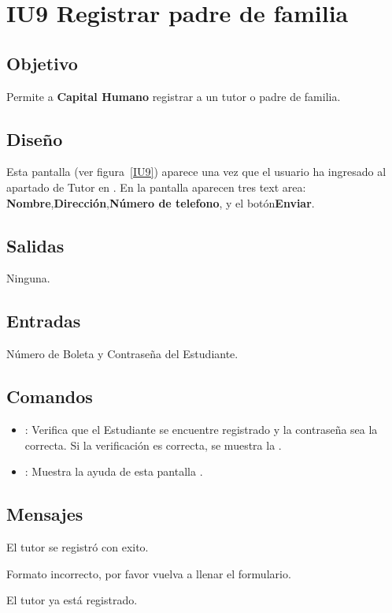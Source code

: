 \newpage
\section{IU9 Registrar padre de familia}

\subsection{Objetivo}
	Permite a {\bf Capital Humano} registrar a un tutor o padre de familia.

\subsection{Diseño}
	Esta pantalla  (ver figura~\ref{IU9}) aparece una vez que el usuario ha ingresado al apartado de Tutor en . 
 En la pantalla aparecen tres text area: {\bf Nombre},{\bf Dirección},{\bf Número de telefono}, y el botón{\bf Enviar}. 
 

\subsection{Salidas}

	Ninguna.

\subsection{Entradas}
Número de Boleta y Contraseña del Estudiante.

\subsection{Comandos}
\begin{itemize}
	\item {}: Verifica que el Estudiante se encuentre registrado y la contraseña sea la correcta. Si la verificación es correcta, se muestra la .
	\item {}: Muestra la ayuda de esta pantalla .
\end{itemize}

\subsection{Mensajes}

\begin{Citemize}
	\item El tutor se registró con exito.
        \item Formato incorrecto, por favor vuelva a llenar el formulario.
        \item El tutor ya está registrado.
\end{Citemize}
